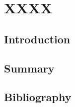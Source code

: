 \chapter{XXXX}
\cleardoublepage

\minitoc

\section{Introduction}
\begin{refsection}
	\label{chX:Introduction}
	\lipsum

	\section{Summary}
	\label{chX:Summary}
	\lipsum

	\cleardoublepage
	\section{Bibliography}
	\label{chX:bib}
	\printbibliography[heading=subbibliography]
\end{refsection}
